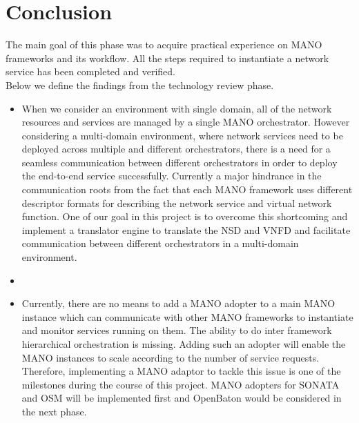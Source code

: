 \chapter{Conclusion}
\label{ch:Conclusion}

The main goal of this phase was to acquire practical experience on MANO frameworks and its workflow. All the steps required to instantiate a network service has been completed and verified.\\

Below we define the findings from the technology review phase.

\begin{itemize}
	
	\item When we consider an environment with single domain, all of the network resources and services are managed by a single MANO orchestrator. However considering a multi-domain
	environment, where network services need to be deployed across multiple and different orchestrators, there is a need for a seamless communication between different orchestrators in order to deploy the end-to-end service successfully. Currently a major hindrance in the communication roots from the fact that each MANO framework uses different descriptor formats for describing the network service and virtual network function. One of our goal in this project is to overcome this shortcoming and  implement a translator engine to translate the NSD and VNFD and facilitate communication between different orchestrators in a multi-domain environment.
	
	\item 
	 
	\item Currently, there are no means to add a MANO adopter to a main MANO instance which can communicate with other MANO frameworks to instantiate and monitor services running on them. The ability to do inter framework hierarchical orchestration is missing. Adding such an adopter will enable the MANO instances to scale according to the number of service requests. Therefore, implementing a MANO adaptor to tackle this issue is one of the milestones during the course of this project. MANO adopters for SONATA and OSM will be implemented first and OpenBaton would be considered in the next phase.
	 
\end{itemize}





